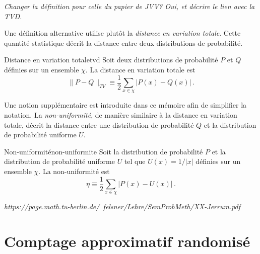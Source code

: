 \textcolor{mydarkred}{\textit{Changer la définition pour celle du papier de JVV? Oui, et décrire le lien avec la TVD.}}

Une définition alternative utilise plutôt la \textit{distance en variation totale}. Cette quantité statistique décrit la distance entre deux distributions de probabilité.

\begin{subdefinition}{Distance en variation totale}{tvd}
    Soit deux distributions de probabilité $P$ et $Q$ définies sur un ensemble $\chi$. La distance en variation totale est
    \begin{equation*}
        \lVert P - Q \rVert_{TV} \equiv \frac{1}{2} \sum_{x \in \chi} \lvert P(x) - Q(x) \rvert \,. 
    \end{equation*}
\end{subdefinition}

Une notion supplémentaire est introduite dans ce mémoire afin de simplifier la notation. La \textit{non-uniformité}, de manière similaire à la distance en variation totale, décrit la distance entre une distribution de probabilité $Q$ et la distribution de probabilité uniforme $U$.

\begin{maindefinition}{Non-uniformité}{non-uniformite}
    Soit la distribution de probabilité $P$ et la distribution de probabilité uniforme $U$ tel que $U(x) = 1/\lvert x \rvert$ définies sur un ensemble $\chi$. La non-uniformité est
    \begin{equation*}
        \eta \equiv \frac{1}{2} \sum_{x \in \chi} \lvert P(x) - U(x) \rvert \,. 
    \end{equation*}
\end{maindefinition}

\textcolor{mydarkred}{\textit{https://page.math.tu-berlin.de/~felsner/Lehre/SemProbMeth/XX-Jerrum.pdf}}



\section{Comptage approximatif randomisé}

